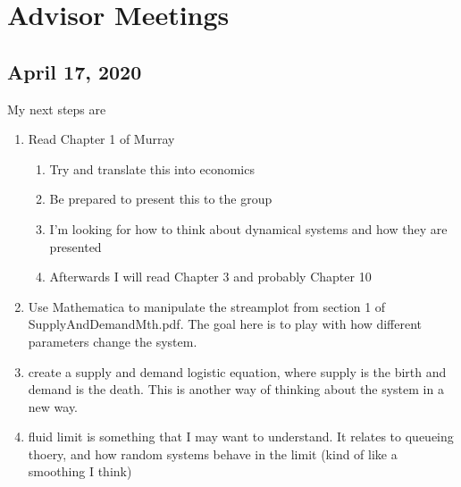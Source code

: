 \section{Advisor Meetings}
\subsection{April 17, 2020}
My next steps are 
\begin{enumerate}
	\item Read Chapter 1 of Murray
	\begin{enumerate}
		\item Try and translate this into economics
		\item Be prepared to present this to the group
		\item I'm looking for how to think about dynamical systems and how they are presented
	  \item Afterwards I will read Chapter 3 and probably Chapter 10
	\end{enumerate}
	\item Use Mathematica to manipulate the streamplot from section 1 of SupplyAndDemandMth.pdf. The goal here is to play with how different parameters change the system. 
	\item create a supply and demand logistic equation, where supply is the birth and demand is the death. This is another way of thinking about the system in a new way.
	\item fluid limit is something that I may want to understand. It relates to queueing thoery, and how random systems behave in the limit (kind of like a smoothing I think)
\end{enumerate} 



